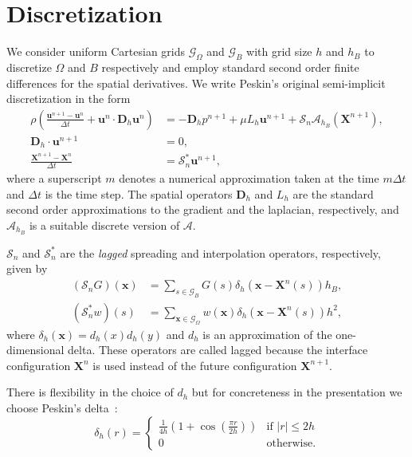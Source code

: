 \documentclass[preprint,12pt]{elsarticle}
\begin{document}
\section{Discretization}
\label{Sec:discretization}
We consider uniform Cartesian grids $\mathcal{G}_\Omega$  and $\mathcal{G}_B$ with grid size $h$ and $h_B$
to discretize $\Omega$ and $B$ respectively and employ standard second order finite differences for the spatial derivatives.  We write Peskin's original semi-implicit discretization in the form
\begin{align}
\rho\left(\frac{\mathbf{u}^{n+1}-\mathbf{u}^n}{\Delta t} + \mathbf{u}^n\cdot\mathbf{D}_h\mathbf{u}^n\right) &= -\mathbf{D}_h p^{n+1}+ \mu L_h \mathbf{u}^{n+1} + \mathcal{S}_n\mathcal{A}_{h_B}(\mathbf{X}^{n+1}), \label{eq:dmoment} \\
\mathbf{D}_h \cdot \mathbf{u}^{n+1} &= 0, \label{eq:ddivergence} \\
\frac{\mathbf{X}^{n+1}-\mathbf{X}^n}{\Delta t} &= \mathcal{S}^*_n\mathbf{u}^{n+1}, \label{eq:Xt}
\end{align}
where a superscript  $m$ denotes a numerical approximation taken at the time $m \Delta t$ and $\Delta t$ is the time step. The spatial operators $\mathbf{D}_h$ and $L_h$ are the standard second order approximations to the gradient and the laplacian, respectively,  and $\mathcal{A}_{h_B}$ is a suitable discrete version of $\mathcal{A}$. 

  $ \mathcal{S}_n$ and $ \mathcal{S}^*_n$ are the  {\em lagged} spreading and interpolation operators, respectively,  given by
\begin{align}
(\mathcal{S}_n G) (\mathbf{x})&= \sum_{s \in \mathcal{G}_B }G(s) \delta_h(\mathbf{x}-\mathbf{X}^n(s))h_B,
\label{eq:S} \\
(\mathcal{S}^*_n w)(s) &= \sum_{ \mathbf{x} \in \mathcal{G}_\Omega} w(\mathbf{x})\delta_h(\mathbf{x}-\mathbf{X}^n(s))h^2,
\label{eq:S*}
\end{align}
where $\delta_h(\mathbf{x}) = d_h(x)d_h(y)$ and $d_h$ is an approximation of the one-dimensional delta. 
These operators are called lagged because the interface configuration $\mathbf{X}^n$ is used 
instead of the future configuration $\mathbf{X}^{n+1}$.

There is flexibility in the choice of $d_h$ but for concreteness in the presentation we choose Peskin's 
delta~\cite{Peskin77}:
\begin{equation}
\delta_h(r) = \begin{cases}
\frac{1}{4h}\left( 1+\cos(\frac{\pi r}{2h})\right)& \textrm{if } |r|\leq 2h \\
0& \textrm{otherwise}.
\end{cases}
\end{equation}
\end{document}
